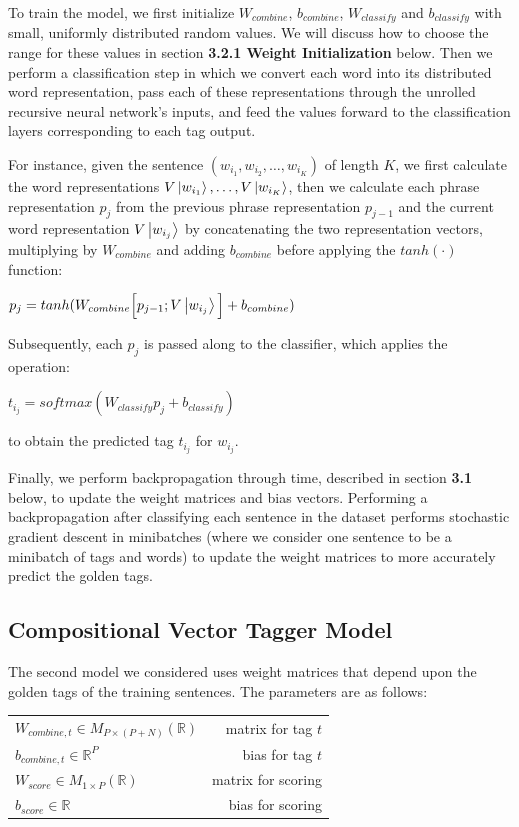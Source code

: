 \documentclass[11pt]{article}
\begin{document}
To train the model, we first initialize $W_{combine}$, $b_{combine}$, $W_{classify}$ and $b_{classify}$ with small, uniformly distributed random values. We will discuss how to choose the range for these values in section \textbf{3.2.1 Weight Initialization} below. Then we perform a classification step in which we convert each word into its distributed word representation, pass each of these representations through the unrolled recursive neural network's inputs, and feed the values forward to the classification layers corresponding to each tag output.

For instance, given the sentence $(w_{i_1},w_{i_2},\ldots,w_{i_K})$ of length $K$, we first calculate the word representations $V\Ket{w_{i_1}},\ldots,V\Ket{w_{i_K}}$, then we calculate each phrase representation $p_j$ from the previous phrase representation $p_{j-1}$ and the current word representation $V\Ket{w_{i_j}}$ by concatenating the two representation vectors, multiplying by $W_{combine}$ and adding $b_{combine}$ before applying the $tanh(\cdot)$ function:

$p_j = tanh(W_{combine}\Big[p_{j-1};V\Ket{w_{i_j}}\Big] + b_{combine})$

Subsequently, each $p_j$ is passed along to the classifier, which applies the operation:

$t_{i_j} = softmax(W_{classify}p_j + b_{classify})$

to obtain the predicted tag $t_{i_j}$ for $w_{i_j}$.

Finally, we perform backpropagation through time, described in section \textbf{3.1} below, to update the weight matrices and bias vectors. Performing a backpropagation after classifying each sentence in the dataset performs stochastic gradient descent in minibatches (where we consider one sentence to be a minibatch of tags and words) to update the weight matrices to more accurately predict the golden tags.

\subsection{Compositional Vector Tagger Model}

The second model we considered uses weight matrices that depend upon the golden tags of the training sentences. The parameters are as follows:

\begin{center}
\begin{tabular}{ l r }
  $W_{combine,t}\in M_{P\times(P+N)}(\mathbb{R})$ & matrix for tag $t$ \\
  $b_{combine,t}\in \mathbb{R}^P$ & bias for tag $t$ \\
  $W_{score}\in M_{1\times P}(\mathbb{R})$ & matrix for scoring \\
  $b_{score}\in \mathbb{R}$ & bias for scoring \\
\end{tabular}
\end{center}
\end{document}
